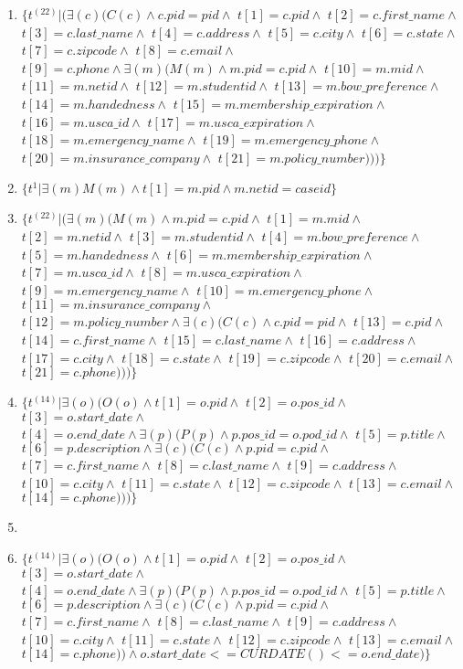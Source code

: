 \documentclass{article}
\begin{document}
\begin{enumerate}
\item $\{t^{(22)}|(\exists(c)(C(c)\wedge c.pid=pid \wedge $ $t[1]=c.pid\wedge $ $t[2]=c.first\_name\wedge$ $t[3]=c.last\_name\wedge$ $t[4]=c.address\wedge$ $t[5]=c.city\wedge$ $t[6]=c.state\wedge$ $t[7]=c.zipcode\wedge$ $t[8]=c.email\wedge$ $t[9]=c.phone\wedge\exists(m)(M(m)\wedge m.pid=c.pid\wedge$ $t[10]=m.mid\wedge$ $t[11]=m.netid\wedge$ $t[12]=m.studentid\wedge$ $t[13]=m.bow\_preference\wedge$ $t[14]=m.handedness\wedge$ $t[15]=m.membership\_expiration\wedge$ $t[16]=m.usca\_id\wedge$ $t[17]=m.usca\_expiration\wedge$ $t[18]=m.emergency\_name\wedge$ $t[19]=m.emergency\_phone\wedge$ $t[20]=m.insurance\_company\wedge$ $t[21]=m.policy\_number)))\}$
\item $\{t^1|\exists(m) M(m)\wedge t[1]=m.pid\wedge m.netid=caseid\}$
\item $\{t^{(22)}|(\exists(m)(M(m)\wedge m.pid=c.pid\wedge$ $t[1]=m.mid\wedge$ $t[2]=m.netid\wedge$ $t[3]=m.studentid\wedge$ $t[4]=m.bow\_preference\wedge$ $t[5]=m.handedness\wedge$ $t[6]=m.membership\_expiration\wedge$ $t[7]=m.usca\_id\wedge$ $t[8]=m.usca\_expiration\wedge$ $t[9]=m.emergency\_name\wedge$ $t[10]=m.emergency\_phone\wedge$ $t[11]=m.insurance\_company\wedge$ $t[12]=m.policy\_number\wedge \exists(c)(C(c)\wedge c.pid=pid \wedge $ $t[13]=c.pid\wedge $ $t[14]=c.first\_name\wedge$ $t[15]=c.last\_name\wedge$ $t[16]=c.address\wedge$ $t[17]=c.city\wedge$ $t[18]=c.state\wedge$ $t[19]=c.zipcode\wedge$ $t[20]=c.email\wedge$ $t[21]=c.phone)))\}$

\item  $\{t^{(14)}|\exists(o)(O(o)\wedge t[1]=o.pid \wedge$ $t[2]=o.pos\_id \wedge$ $t[3]=o.start\_date \wedge$ $t[4]=o.end\_date \wedge \exists(p)(P(p)\wedge p.pos\_id=o.pod\_id  \wedge$ $t[5]=p.title \wedge$ $t[6]=p.description \wedge \exists(c)(C(c)\wedge p.pid=c.pid \wedge$ $t[7]=c.first\_name \wedge$ $t[8]=c.last\_name\wedge$ $t[9]=c.address\wedge$ $t[10]=c.city \wedge$ $t[11]=c.state\wedge$ $t[12]=c.zipcode\wedge$ $t[13]=c.email\wedge$ $t[14]=c.phone )))\}$

\item \item  $\{t^{(14)}|\exists(o)(O(o)\wedge t[1]=o.pid \wedge$ $t[2]=o.pos\_id \wedge$ $t[3]=o.start\_date \wedge$ $t[4]=o.end\_date \wedge \exists(p)(P(p)\wedge p.pos\_id=o.pod\_id  \wedge$ $t[5]=p.title \wedge$ $t[6]=p.description \wedge \exists(c)(C(c)\wedge p.pid=c.pid \wedge$ $t[7]=c.first\_name \wedge$ $t[8]=c.last\_name\wedge$ $t[9]=c.address\wedge$ $t[10]=c.city \wedge$ $t[11]=c.state\wedge$ $t[12]=c.zipcode\wedge$ $t[13]=c.email\wedge$ $t[14]=c.phone ))\wedge o.start\_date<=CURDATE()<=o.end\_date  )\}$


\end{enumerate}
\end{document}
